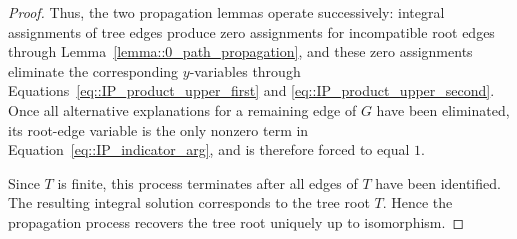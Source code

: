 \begin{proof}
  Thus, the two propagation lemmas operate successively: integral
  assignments of tree edges produce zero assignments for incompatible
  root edges through Lemma~\eqref{lemma::0_path_propagation}, and these
  zero assignments eliminate the corresponding $y$-variables through
  Equations~\eqref{eq::IP_product_upper_first} and
  \eqref{eq::IP_product_upper_second}. Once all alternative
  explanations for a remaining edge of $G$ have been eliminated, its
  root-edge variable is the only nonzero term in
  Equation~\eqref{eq::IP_indicator_arg}, and is therefore forced to
  equal $1$.

  Since $T$ is finite, this process terminates after all edges of $T$
  have been identified. The resulting integral solution corresponds to
  the tree root $T$. Hence the propagation process recovers the tree
  root uniquely up to isomorphism.
\end{proof}